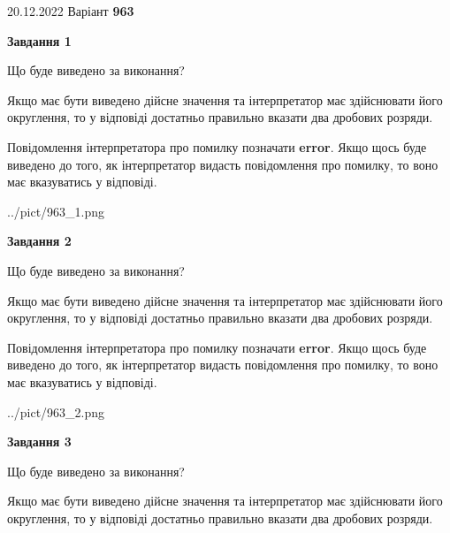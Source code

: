 \documentclass[12pt, ukrainian]{article}
\begin{document}
{20.12.2022 Варіант \No \textbf { 963 }\par}
{
\begin {Large}

{\begin {center}\textbf{Завдання 1}\end {center}}\par
Що буде виведено за виконання? \par

Якщо має бути виведено дійсне значення та інтерпретатор має здійснювати його округлення, 
то у відповіді достатньо правильно вказати два дробових розряди.

Повідомлення інтерпретатора про помилку позначати \textbf{error}.
Якщо щось буде виведено до того, як інтерпретатор видасть повідомлення про помилку, 
то воно має вказуватись у відповіді. \par

\begin{center}
	{../pict/963_1.png}
\end{center}
\newpage

{\begin {center}\textbf{Завдання 2}\end {center}}\par
Що буде виведено за виконання? \par

Якщо має бути виведено дійсне значення та інтерпретатор має здійснювати його округлення, 
то у відповіді достатньо правильно вказати два дробових розряди.

Повідомлення інтерпретатора про помилку позначати \textbf{error}.
Якщо щось буде виведено до того, як інтерпретатор видасть повідомлення про помилку, 
то воно має вказуватись у відповіді. \par

\begin{center}
	{../pict/963_2.png}
\end{center}
\newpage

{\begin {center}\textbf{Завдання 3}\end {center}}\par
Що буде виведено за виконання? \par

Якщо має бути виведено дійсне значення та інтерпретатор має здійснювати його округлення, 
то у відповіді достатньо правильно вказати два дробових розряди.


\end{Large}}
\end{document}
